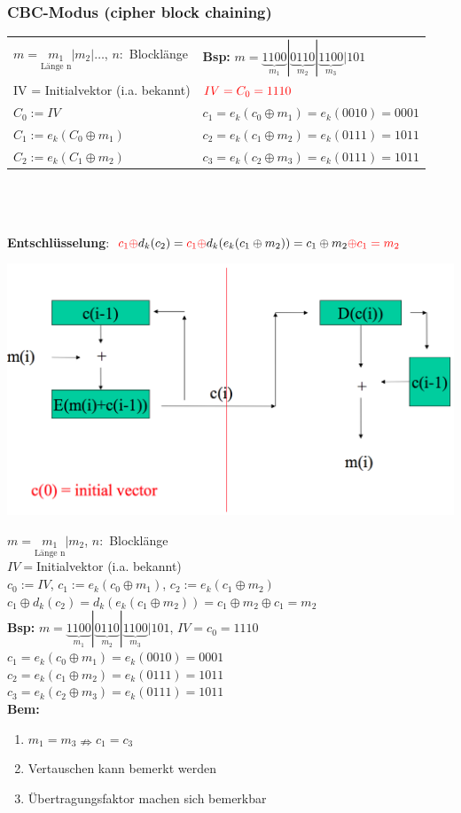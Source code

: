 \documentclass[10pt]{article}
\newcommand{\Bold}[1]{\textbf{#1}} %
\newcommand{\T}[1]{\text{#1}} %
\newcommand{\Unten}[2]{\underset{#1}{#2}} %
\begin{document}
\subsubsection{CBC-Modus (cipher block chaining)}
\begin{tabular}{p{7.5cm}  l}
	$m=\Unten{\T{Länge n}}{m_1}|m_2|\dots$, $n:$ Blocklänge &\Bold{Bsp:} $m=\underbrace{1100}_{m_1} | \underbrace{0110}_{m_2} | \underbrace{1100}_{m_3} | 101$ \\
	{\color{red}IV = Initialvektor} (i.a. bekannt) &  $\color{red}IV=C_0=1110$  \\
	$C_0 := IV$ & $c_1 = e_k(c_0 \oplus m_1) = e_k(0010) = 0001$ \\
	$C_1 := e_k(C_0 \oplus m_1)$ & $c_2 = e_k(c_1 \oplus m_2) = e_k(0111) = 1011$ \\
	$C_2 := e_k(C_1 \oplus m_2)$  & $c_3 = e_k(c_2 \oplus m_3) = e_k(0111) = 1011$ \\
\end{tabular} \\ \\ \\
 \textbf{Entschlüsselung}: ${\color{red}c_1\oplus} d_k(c_2)={\color{red}c_1\oplus}d_k(e_k(c_1\oplus m_2))= c_1\oplus m_2 {\color{red}\oplus c_1 = m_2}$
 \begin{center}
	\includegraphics[scale=0.2]{cbc-encryption.png}
 \end{center}
 $m=\Unten{\T{Länge n}}{m_1}|m_2$, $n:$ Blocklänge\\
 $IV=$Initialvektor (i.a. bekannt)\\
 $c_0:=IV$, $c_1:=e_k(c_0\oplus m_1)$, $c_2:=e_k(c_1\oplus m_2)$\\
 $c_1\oplus d_k(c_2)=d_k(e_k(c_1\oplus m_2))=c_1\oplus m_2\oplus c_1=m_2$\\
 \Bold{Bsp:} $m=\underbrace{1100}_{m_1}|\underbrace{0110}_{m_2}|\underbrace{1100}_{m_3}|101$, $IV=c_0=1110$\\
 $c_1=e_k(c_0\oplus m_1)=e_k(0010)=0001$\\
 $c_2=e_k(c_1\oplus m_2)=e_k(0111)=1011$\\
 $c_3=e_k(c_2\oplus m_3)=e_k(0111)=1011$\\
 \Bold{Bem:} \begin{enumerate}
              \item $m_1=m_3\nRightarrow c_1=c_3$
              \item Vertauschen kann bemerkt werden
              \item Übertragungsfaktor machen sich bemerkbar
             \end{enumerate}
\end{document}
